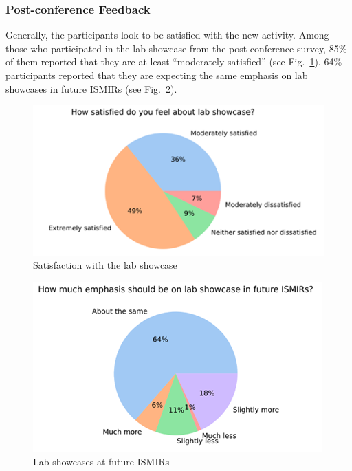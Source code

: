 \documentclass[%
10pt,								%
]
{scrartcl}
\begin{document}
        \subsubsection{Post-conference Feedback}
            Generally, the participants look to be satisfied with the new activity. Among those who participated in the lab showcase from the post-conference survey, 85\% of them reported that they are at least ``moderately satisfied'' (see Fig.~\ref{fig:labshowcase_satisfaction}). 64\% participants reported that they are expecting the same emphasis on lab showcases in future ISMIRs (see Fig.~\ref{fig:labshowcase_future}).
        \begin{figure}%
            \includegraphics[width=\columnwidth]{fig/labshowcase_satisfaction}%
            \caption{Satisfaction with the lab showcase}%
            \label{fig:labshowcase_satisfaction}%
        \end{figure}
        \begin{figure}%
            \includegraphics[width=\columnwidth]{fig/labshowcase_future}%
            \caption{Lab showcases at future ISMIRs}%
            \label{fig:labshowcase_future}%
        \end{figure}
        
\end{document}
